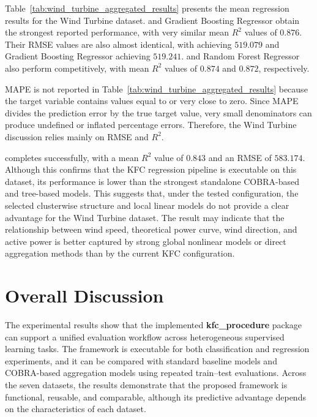 \hs Table~\ref{tab:wind_turbine_aggregated_results} presents the mean regression results for the Wind Turbine dataset.  and Gradient Boosting Regressor obtain the strongest reported performance, with very similar mean $R^2$ values of $0.876$. Their RMSE values are also almost identical, with  achieving $519.079$ and Gradient Boosting Regressor achieving $519.241$.  and Random Forest Regressor also perform competitively, with mean $R^2$ values of $0.874$ and $0.872$, respectively.




MAPE is not reported in Table~\ref{tab:wind_turbine_aggregated_results} because the target variable contains values equal to or very close to zero. Since MAPE divides the prediction error by the true target value, very small denominators can produce undefined or inflated percentage errors. Therefore, the Wind Turbine discussion relies mainly on RMSE and $R^2$.

 completes successfully, with a mean $R^2$ value of $0.843$ and an RMSE of $583.174$. Although this confirms that the KFC regression pipeline is executable on this dataset, its performance is lower than the strongest standalone COBRA-based and tree-based models. This suggests that, under the tested configuration, the selected clusterwise structure and local linear models do not provide a clear advantage for the Wind Turbine dataset. The result may indicate that the relationship between wind speed, theoretical power curve, wind direction, and active power is better captured by strong global nonlinear models or direct aggregation methods than by the current KFC configuration.

\section{Overall Discussion}
\label{sec:overall_discussion_results}

\hs The experimental results show that the implemented \textbf{kfc\_procedure} package can support a unified evaluation workflow across heterogeneous supervised learning tasks. The framework is executable for both classification and regression experiments, and it can be compared with standard baseline models and COBRA-based aggregation models using repeated train--test evaluations. Across the seven datasets, the results demonstrate that the proposed framework is functional, reusable, and comparable, although its predictive advantage depends on the characteristics of each dataset.

